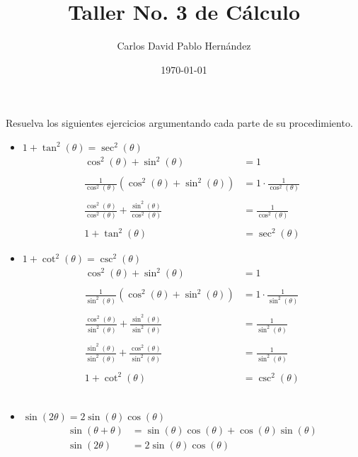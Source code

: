 \documentclass[12pt]{article}
\title{Taller No. 3 de Cálculo}
\author{Carlos David Pablo Hernández}
\date{\today}
\begin{document}
\maketitle

\section{}
Resuelva los siguientes ejercicios 
argumentando cada parte de su procedimiento.

\begin{itemize}
    \item $1 + \tan^2(\theta) = \sec^2(\theta)$
        \begin{align*}
            \cos^2(\theta) + \sin^2(\theta) &= 1 \\ \\
            \frac{1}{\cos^2(\theta)} \left( \cos^2(\theta) + \sin^2(\theta) \right) &= 1 \cdot  \frac{1}{\cos^2(\theta)} \\ \\
            \frac{\cos^2(\theta)}{\cos^2(\theta)} + \frac{\sin^2(\theta)}{\cos^2(\theta)} &= \frac{1}{\cos^2(\theta)} \\ \\
            1 + \tan^2(\theta) &= \sec^2(\theta) \tag*{$\square$}
        \end{align*}


    \item $1 + \cot^2(\theta) = \csc^2(\theta)$
        \begin{align*}
            \cos^2(\theta) + \sin^2(\theta) &= 1 \\ \\
            \frac{1}{\sin^2(\theta)} \left( \cos^2(\theta) + \sin^2(\theta) \right) &= 1 \cdot \frac{1}{\sin^2(\theta)} \\ \\
            \frac{\cos^2(\theta)}{\sin^2(\theta)} + \frac{\sin^2(\theta)}{\sin^2(\theta)} &= \frac{1}{\sin^2(\theta)} \\ \\
            \frac{\sin^2 (\theta)}{\sin^2 (\theta)} + \frac{\cos^2 (\theta)}{\sin^2 (\theta)} &= \frac{1}{\sin^2 (\theta)} \\ \\
            1 + \cot^2(\theta) &= \csc^2(\theta) \tag*{$\square$}
        \end{align*}
            \\

    \item $\sin \left(2 \theta\right) = 2 \sin(\theta) \cos \left(\theta\right)$
        \begin{align*}
            \sin(\theta + \theta) &= \sin(\theta)\cos(\theta) + \cos(\theta)\sin(\theta) \\
            \sin(2 \theta)&= 2\sin(\theta)\cos(\theta) \tag*{$\square$}
        \end{align*}
            \\


\end{itemize}
\end{document}
